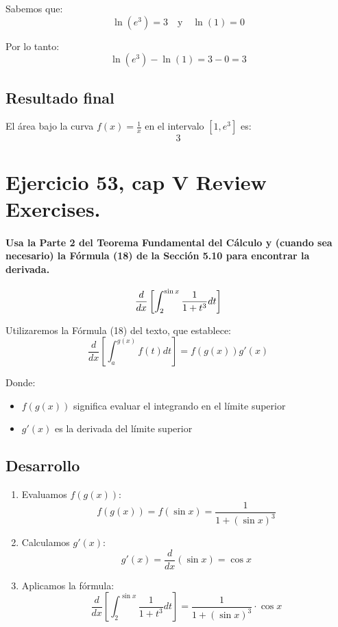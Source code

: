 \documentclass[11pt,letterpaper]{article}
\begin{document}
Sabemos que:
\[
\ln(e^3) = 3 \quad \text{y} \quad \ln(1) = 0
\]

Por lo tanto:
\[
\ln(e^3) - \ln(1) = 3 - 0 = 3
\]

\subsection*{Resultado final}
El área bajo la curva \(f(x) = \frac{1}{x}\) en el intervalo \([1, e^3]\) es:
\[
\boxed{3}
\]


\section{Ejercicio 53, cap V Review Exercises.}
\paragraph*{Usa la Parte 2 del Teorema Fundamental del Cálculo y (cuando sea necesario) la Fórmula (18) de la Sección 5.10 para encontrar la derivada.}
\begin{equation*}
  \frac{d}{dx}\left[\int_{2}^{\sin x} \frac{1}{1+t^3}dt\right]
  \vspace{0.3cm}
\end{equation*}

Utilizaremos la Fórmula (18) del texto, que establece:
\[
\frac{d}{dx}\left[\int_{a}^{g(x)} f(t) dt\right] = f(g(x))g'(x)
\]

Donde:
\begin{itemize}
    \item $f(g(x))$ significa evaluar el integrando en el límite superior
    \item $g'(x)$ es la derivada del límite superior
\end{itemize}

\subsection*{Desarrollo}
\begin{enumerate}
    \item Evaluamos $f(g(x))$:
    \[
    f(g(x)) = f(\sin x) = \frac{1}{1+(\sin x)^3}
    \]
    
    \item Calculamos $g'(x)$:
    \[
    g'(x) = \frac{d}{dx}(\sin x) = \cos x
    \]
    
    \item Aplicamos la fórmula:
    \[
    \frac{d}{dx}\left[\int_{2}^{\sin x} \frac{1}{1+t^3} dt\right] = \frac{1}{1+(\sin x)^3} \cdot \cos x
    \]
\end{enumerate}
\end{document}
